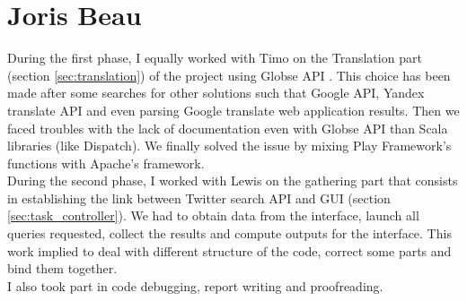 \section{Joris Beau}
During the first phase, I equally worked with Timo on the Translation part (section \ref{sec:translation}) of the project using Globse API \cite{globse}. This choice has been made after some searches for other solutions such that Google API, Yandex translate API and even parsing Google translate web application results.
Then we faced troubles with the lack of documentation even with Globse API than Scala libraries (like Dispatch). We finally solved the issue by mixing Play Framework's functions with Apache's framework.\\
During the second phase, I worked with Lewis on the gathering part that consists in establishing the link between Twitter search API and GUI (section \ref{sec:task_controller}). We had to obtain data from the interface, launch all queries requested, collect the results and compute outputs for the interface. This work implied to deal with different structure of the code, correct some parts and bind them together.\\
I also took part in code debugging, report writing and proofreading.\\